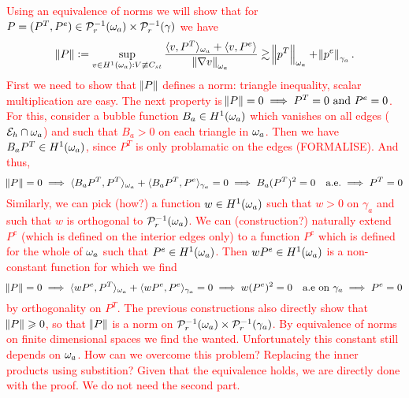\documentclass[thesis.tex]{subfiles}
\begin{document}
  \textcolor{red}{
  Using an equivalence of norms we will show that for $P = (P^T, P^e) \in \mathcal{P}_r^{-1}(\omega_a) \times \mathcal{P}_r^{-1}(\gamma)$ we have
    \[
      \|P\| := \sup_{v \in H^1(\omega_a) : V\not \equiv C_{st}} \frac{\langle{v, P^T}\rangle_{\omega_a} + \langle v, P^e \rangle}{\norm{\nabla v}_{\omega_a}} \gtrsim
      \norm{p^T}_{\omega_a} + \norm{p^e}_{\gamma_a}.
    \]
    First we need to show that $\norm{P}$ defines a norm: triangle inequality, scalar multiplication are easy.
    The next property is $\norm{P} = 0 \implies P^T = 0 \text{ and }  P^e = 0$. For this, consider a bubble function $B_a \in H^1(\omega_a)$
    which vanishes on all edges  ($\mathcal{E}_h \cap \omega_a$) and such that $B_a > 0$ on each triangle in $\omega_a$. Then we have $B_a P^T \in H^1(\omega_a)$, since $P^T$ is only problamatic on the edges (FORMALISE). And thus,
    \[
      \norm{P} = 0 \implies \langle{B_aP^T, P^T}\rangle_{\omega_a} + \langle B_aP^T, P^e \rangle_{\gamma_a} = 0 \implies B_a(P^T)^2 = 0\quad\text{a.e.} \implies P^T = 0
    \]
    Similarly, we can pick (how?) a function $w \in H^1(\omega_a)$ such that $w > 0$ on $\gamma_a$ and such that $w$ is orthogonal to $\mathcal{P}_r^{-1}(\omega_a)$.
    We can (construction?) naturally extend $P^e$ (which is defined on the interior edges only) to a function $P^e$ which is defined for the whole of $\omega_a$ such that $P^e \in H^1(\omega_a)$. Then $wP^e \in H^1(\omega_a)$ is a non-constant function for which we find
    \[
      \norm{P} = 0 \implies \langle{wP^e, P^T}\rangle_{\omega_a} + \langle wP^e, P^e \rangle_{\gamma_a}  = 0 \implies w(P^e)^2 = 0 \quad\text{a.e on }\gamma_a \implies P^e = 0
    \]
    by orthogonality on $P^T$.
    The previous constructions also directly show that $\norm{P} \geqslant 0$, so that $\norm{P}$ is a norm on $\mathcal{P}_r^{-1}(\omega_a)\times\mathcal{P}_r^{-1}(\gamma_a)$. By equivalence of norms on finite dimensional spaces we find the wanted. Unfortunately this constant
    still depends on $\omega_a$. How can we overcome this problem? Replacing the inner products using substition?
    Given that the equivalence holds, we are directly done with the proof. We do not need the second part.
  }
\fi
\end{document}
